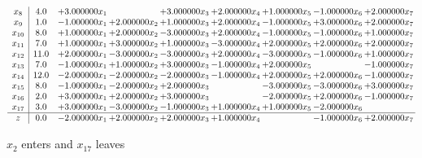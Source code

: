 \documentclass[10pt]{article}
\begin{document}
\[\begin{array}{c| c c@{\hskip 2pt} c@{\hskip 2pt} c@{\hskip 2pt} c@{\hskip 2pt} c@{\hskip 2pt} c@{\hskip 2pt} c@{\hskip 2pt} }
 x_{8}   &  4.0 & + 3.000000 x_{1} &   & + 3.000000 x_{3} & + 2.000000 x_{4} & + 1.000000 x_{5} & -1.000000 x_{6} & + 2.000000 x_{7}\\
 x_{9}   &  1.0 & -1.000000 x_{1} & + 2.000000 x_{2} & + 1.000000 x_{3} & + 2.000000 x_{4} & -1.000000 x_{5} & + 3.000000 x_{6} & + 2.000000 x_{7}\\
 x_{10}   &  8.0 & + 1.000000 x_{1} & + 2.000000 x_{2} & -3.000000 x_{3} & + 2.000000 x_{4} & -1.000000 x_{5} & -1.000000 x_{6} & + 1.000000 x_{7}\\
 x_{11}   &  7.0 & + 1.000000 x_{1} & + 3.000000 x_{2} & + 1.000000 x_{3} & -3.000000 x_{4} & + 2.000000 x_{5} & + 2.000000 x_{6} & + 2.000000 x_{7}\\
 x_{12}   &  11.0 & + 2.000000 x_{1} & -3.000000 x_{2} & -3.000000 x_{3} & + 2.000000 x_{4} & -3.000000 x_{5} & -1.000000 x_{6} & + 1.000000 x_{7}\\
 x_{13}   &  7.0 & -1.000000 x_{1} & + 1.000000 x_{2} & + 3.000000 x_{3} & -1.000000 x_{4} & + 2.000000 x_{5} &   & -1.000000 x_{7}\\
 x_{14}   &  12.0 & -2.000000 x_{1} & -2.000000 x_{2} & -2.000000 x_{3} & -1.000000 x_{4} & + 2.000000 x_{5} & + 2.000000 x_{6} & -1.000000 x_{7}\\
 x_{15}   &  8.0 & -1.000000 x_{1} & -2.000000 x_{2} & + 2.000000 x_{3} &   & -3.000000 x_{5} & -3.000000 x_{6} & + 3.000000 x_{7}\\
 x_{16}   &  2.0 & + 3.000000 x_{1} & + 2.000000 x_{2} & + 3.000000 x_{3} &   & -2.000000 x_{5} & + 2.000000 x_{6} & -1.000000 x_{7}\\
 x_{17}   &  3.0 & + 3.000000 x_{1} & -3.000000 x_{2} & -1.000000 x_{3} & + 1.000000 x_{4} & + 1.000000 x_{5} & -2.000000 x_{6} &   \\
\hline
z    &  0.0 & -2.000000 x_{1} & + 2.000000 x_{2} & + 2.000000 x_{3} & + 1.000000 x_{4} &   & -1.000000 x_{6} & + 2.000000 x_{7}\\
\end{array}\]


 $ x_{2} $ enters and $ x_{17} $ leaves 
\end{document}
